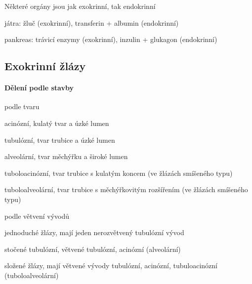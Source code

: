 \documentclass[DIV=8]{scrreprt}
\begin{document}
Některé orgány jsou jak exokrinní, tak endokrinní
\begin{myItemize}[nosep]
    \item játra: žluč (exokrinní), transferin + albumin (endokrinní)
    \item pankreas: trávicí enzymy (exokrinní), inzulin + glukagon (endokrinní)
\end{myItemize}



\subsection{Exokrinní žlázy} \label{Exokrinní žlázy}


\paragraph{Dělení podle stavby}
\begin{myItemize}[nosep]
    \item podle tvaru
\begin{myItemize}[nosep]
    \item acinózní, kulatý tvar a úzké lumen
    \item tubulózní, tvar trubice a úzké lumen
    \item alveolární, tvar měchýřku a široké lumen
    \item tuboloacinózní,  tvar trubice s kulatým koncem (ve žlázách smíšeného typu)
    \item tuboloalveolární, tvar trubice s měchýřkovitým rozšířením (ve žlázách smíšeného typu)
\end{myItemize}

    \item podle větvení vývodů
\begin{myItemize}[nosep]
    \item jednoduché žlázy, mají jeden nerozvětvený tubulózní vývod
\begin{myItemize}[nosep]
    \item stočené tubulózní, větvené tubulózní, acinózní (alveolární)
\end{myItemize}

    \item složené žlázy, mají větvené vývody
    tubulózní, acinózní, tubuloacinózní (tuboloalveolární)
\end{myItemize}

\end{myItemize}
\end{document}
